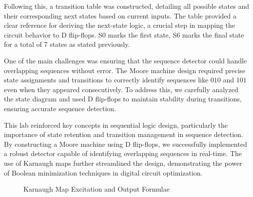 \documentclass[12pt]{article}
\begin{document}
Following this, a transition table was constructed, detailing all possible
states and their corresponding next states based on current inputs. The table
provided a clear reference for deriving the next-state logic, a crucial step in
mapping the circuit behavior to D flip-flops. S0 marks the first state, S6 marks
the final state for a total of 7 states as stated previously.

One of the main challenges was ensuring that the sequence detector could handle
overlapping sequences without error. The Moore machine design required precise
state assignments and transitions to correctly identify sequences like \( 010 \)
and \( 101 \) even when they appeared consecutively. To address this, we
carefully analyzed the state diagram and used D flip-flops to maintain stability
during transitions, ensuring accurate sequence detection.

This lab reinforced key concepts in sequential logic design, particularly the
importance of state retention and transition management in sequence detection.
By constructing a Moore machine using D flip-flops, we successfully implemented
a robust detector capable of identifying overlapping sequences in real-time. The
use of Karnaugh maps further streamlined the design, demonstrating the power of
Boolean minimization techniques in digital circuit optimization.
\begin{figure}[H]
 \hspace{2cm}

\hspace{2cm}

\caption{Karnaugh Map Excitation and Output Formulae}
\end{figure}
\end{document}
